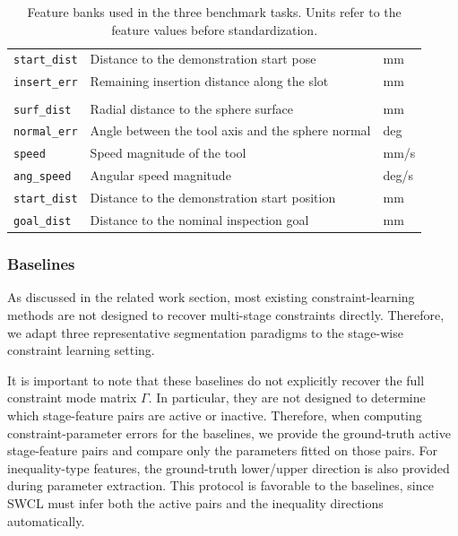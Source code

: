 \documentclass[lettersize,journal]{IEEEtran}
\begin{document}
\begin{table}[t]
\begin{tabularx}{\columnwidth}{
@{}
>{\raggedright\arraybackslash}p{2.05cm}
>{\raggedright\arraybackslash}X
>{\centering\arraybackslash}p{0.75cm}
@{}
}
\texttt{start\_dist}
& Distance to the demonstration start pose
& mm \\

\texttt{insert\_err}
& Remaining insertion distance along the slot
& mm \\

\addlinespace[0.25em]
\midrule
\addlinespace[0.1em]

\multicolumn{3}{@{}l}{\textbf{\texttt{S5SphereInspect}}} \\
\addlinespace[0.1em]
\texttt{surf\_dist}
& Radial distance to the sphere surface
& mm \\

\texttt{normal\_err}
& Angle between the tool axis and the sphere normal
& deg \\

\texttt{speed}
& Speed magnitude of the tool
& mm/s \\

\texttt{ang\_speed}
& Angular speed magnitude
& deg/s \\

\texttt{start\_dist}
& Distance to the demonstration start position
& mm \\

\texttt{goal\_dist}
& Distance to the nominal inspection goal
& mm \\

\bottomrule
\end{tabularx}

\caption{
Feature banks used in the three benchmark tasks.
Units refer to the feature values before standardization.
}
\label{tab:dataset_features}
\end{table}

\subsubsection{Baselines}
As discussed in the related work section, most existing constraint-learning methods are not designed to recover multi-stage constraints directly. Therefore, we adapt three representative segmentation paradigms to the stage-wise constraint learning setting.

It is important to note that these baselines do not explicitly recover the full constraint mode matrix $\Gamma$. In particular, they are not designed to determine which stage-feature pairs are active or inactive. Therefore, when computing constraint-parameter errors for the baselines, we provide the ground-truth active stage-feature pairs and compare only the parameters fitted on those pairs. For inequality-type features, the ground-truth lower/upper direction is also provided during parameter extraction. This protocol is favorable to the baselines, since SWCL must infer both the active pairs and the inequality directions automatically.
\end{document}
